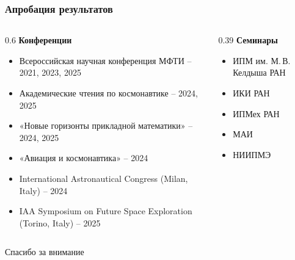 \begin{frame}
    \frametitle{Апробация результатов}
    \begin{columns}[T,onlytextwidth]
        \begin{column}{0.6\textwidth}
            \textbf{Конференции}
            \begin{itemize}
                \item Всероссийская научная конференция МФТИ -- 2021, 2023, 2025
                \item Академические чтения по космонавтике --  2024, 2025
                \item «Новые горизонты прикладной математики» -- 2024, 2025
                \item «Авиация и космонавтика» -- 2024
                \item International Astronautical Congress (Milan, Italy) -- 2024
                \item IAA Symposium on Future Space Exploration (Torino, Italy) -- 2025
            \end{itemize}
        \end{column}
        \begin{column}{0.39\textwidth}
            \textbf{Семинары}
            \begin{itemize}
                \item ИПМ им. М.\,В. Келдыша РАН
                \item ИКИ РАН
                \item ИПМех РАН
                \item МАИ
                \item НИИПМЭ
            \end{itemize}
        \end{column}
    \end{columns}
\end{frame}
\begin{frame}[plain]
    \begin{center}
        \Huge
        Спасибо за внимание
    \end{center}
\end{frame}
